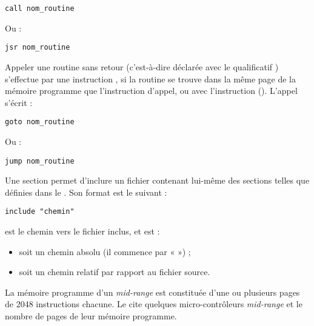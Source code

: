 \begin{lstlisting}[language=piccolo]
call nom_routine
\end{lstlisting}

Ou :

\begin{lstlisting}[language=piccolo]
jsr nom_routine
\end{lstlisting}





Appeler une routine sans retour (c'est-à-dire déclarée avec le qualificatif ) s'effectue par une instruction , si la routine se trouve dans la même page de la mémoire programme que l'instruction d'appel, ou avec l'instruction  (). L'appel s'écrit :
\begin{lstlisting}[language=piccolo]
goto nom_routine
\end{lstlisting}

Ou :

\begin{lstlisting}[language=piccolo]
jump nom_routine
\end{lstlisting}





Une section  permet d'inclure un fichier contenant lui-même des sections telles que définies dans le .  Son format est le suivant :

\begin{lstlisting}[language=piccolo]
  include "chemin"
\end{lstlisting}

 est le chemin vers le fichier inclus, et est :
\begin{itemize}
  \item soit un chemin absolu (il commence par « \piccolo{/} ») ;
  \item soit un chemin relatif par rapport au fichier source.
\end{itemize}


La mémoire programme d'un \emph{mid-range} est constituée d'une ou plusieurs pages de 2048 instructions chacune. Le  cite quelques micro-contrôleurs \emph{mid-range} et le nombre de pages de leur mémoire programme.

